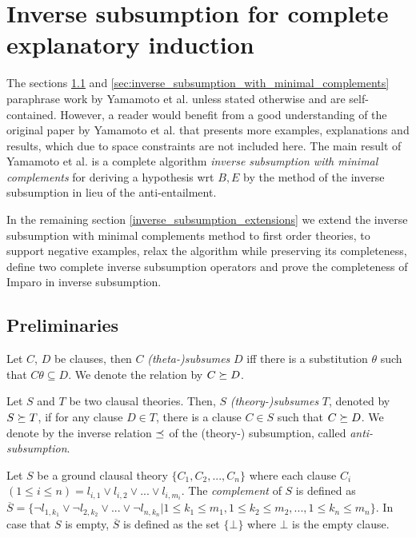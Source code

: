 \chapter{Inverse subsumption for complete explanatory induction\cite{yamamoto2012inverse}}
\label{inverse_subsumption_for_complete_explanatory_induction}
The sections \ref{sec:preliminaries} and \ref{sec:inverse_subsumption_with_minimal_complements} paraphrase work by Yamamoto et al. \cite{yamamoto2012inverse} unless stated otherwise and are self-contained. However, a reader would benefit from a good understanding of the original paper by Yamamoto et al. that presents more examples, explanations and results, which due to space constraints are not included here. The main result of Yamamoto et al. is a complete algorithm \emph{inverse subsumption with minimal complements} for deriving a hypothesis wrt $B, E$ by the method of the inverse subsumption in lieu of the anti-entailment.

In the remaining section \ref{inverse_subsumption_extensions} we extend the inverse subsumption with minimal complements method to first order theories, to support negative examples, relax the algorithm while preserving its completeness, define two complete inverse subsumption operators and prove the completeness of Imparo in inverse subsumption.

\section{Preliminaries}\label{sec:preliminaries}
\begin{defn}
Let $C$, $D$ be clauses, then $C$ \emph{(theta-)subsumes} $D$ iff there is a substitution $\theta$ such that $C \theta \subseteq D$. We denote the relation by $C \succeq D$.
\end{defn}

\begin{defn}\label{definition_theory_subsumption}
Let $S$ and $T$ be two clausal theories. Then, $S$ \emph{(theory-)subsumes} $T$, denoted by $S \succeq T$, if for any clause $D \in T$, there is a clause $C \in S$ such
that $C \succeq D$. We denote by the inverse relation $\preceq$ of the (theory-) subsumption, called \emph{anti-subsumption}.
\end{defn}

\begin{defn}
Let $S$ be a ground clausal theory $\{C_1, C_2,... ,C_n\}$ where each clause $C_i$ $(1 \le i \le n)= l_{i,1} \lor l_{i,2} \lor... \lor l_{i,m_i}$.
The \emph{complement} of $S$ is defined as
\\$\overline{S} = \{\neg l_{1,k_1} \lor \neg l_{2,k_2} \lor... \lor \neg l_{n,k_n} |
1 \le k_1 \le m_1 , 1 \le k_2 \le m_2,..., 1 \le k_n \le m_n\}$.
In case that $S$ is empty, $\overline{S}$ is defined as the set $\{\bot\}$ where $\bot$ is the empty clause.
\end{defn}

